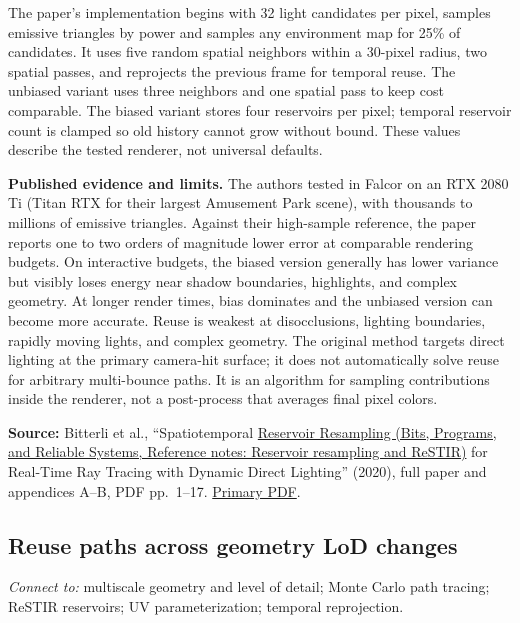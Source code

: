 The paper's implementation begins with 32 light candidates per pixel, samples emissive triangles by power and samples any environment map for 25\% of candidates. It uses five random spatial neighbors within a 30-pixel radius, two spatial passes, and reprojects the previous frame for temporal reuse. The unbiased variant uses three neighbors and one spatial pass to keep cost comparable. The biased variant stores four reservoirs per pixel; temporal reservoir count is clamped so old history cannot grow without bound. These values describe the tested renderer, not universal defaults.

\textbf{Published evidence and limits.} The authors tested in Falcor on an RTX 2080 Ti (Titan RTX for their largest Amusement Park scene), with thousands to millions of emissive triangles. Against their high-sample reference, the paper reports one to two orders of magnitude lower error at comparable rendering budgets. On interactive budgets, the biased version generally has lower variance but visibly loses energy near shadow boundaries, highlights, and complex geometry. At longer render times, bias dominates and the unbiased version can become more accurate. Reuse is weakest at disocclusions, lighting boundaries, rapidly moving lights, and complex geometry. The original method targets direct lighting at the primary camera-hit surface; it does not automatically solve reuse for arbitrary multi-bounce paths. It is an algorithm for sampling contributions inside the renderer, not a post-process that averages final pixel colors.

\textbf{Source:} Bitterli et al., ``Spatiotemporal \href{../01-Bits-Programs-and-Reliable-Systems/main.pdf\#nameddest=appendix-68be451b78b1}{Reservoir Resampling (Bits, Programs, and Reliable Systems, Reference notes: Reservoir resampling and ReSTIR)} for Real-Time Ray Tracing with Dynamic Direct Lighting'' (2020), full paper and appendices A--B, PDF pp.~1--17. \href{https://benedikt-bitterli.me/restir/bitterli20restir.pdf}{Primary PDF}.

\subsection{Reuse paths across geometry LoD changes}\label{03-visual-computing-i-ch012-reuse-paths-across-geometry-lod-changes}

\emph{Connect to:} multiscale geometry and level of detail; Monte Carlo path tracing; ReSTIR reservoirs; UV parameterization; temporal reprojection.

